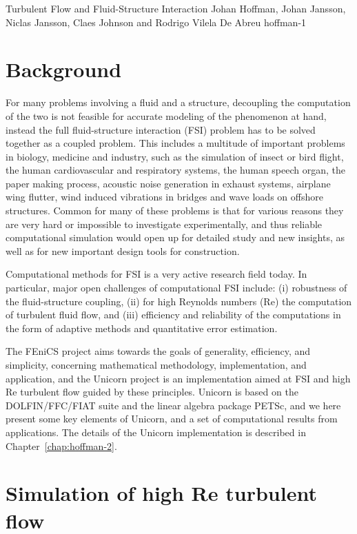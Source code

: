               {Turbulent Flow and Fluid-Structure Interaction}
              {Johan Hoffman, Johan Jansson, Niclas Jansson, Claes Johnson and Rodrigo Vilela De Abreu}
              {hoffman-1}

\section{Background}

For many problems involving a fluid and a structure, decoupling the computation of the two is
not feasible for accurate modeling of the phenomenon at hand, instead the full fluid-structure interaction (FSI) problem
has to be solved together as a coupled problem. This includes a multitude of important
problems in biology, medicine and industry, such as the simulation of insect or bird flight, the
human cardiovascular and respiratory systems, the human speech organ, the paper making process,
acoustic noise generation in exhaust systems, airplane wing flutter, wind induced vibrations in
bridges and wave loads on offshore structures. Common for many of these problems is that
for various reasons they are very hard or impossible to investigate experimentally, and thus
reliable computational simulation would open up for detailed study and new insights, as well
as for new important design tools for construction.

Computational methods for FSI is a very active research field today. In particular, major open challenges of computational FSI include: (i) robustness of the fluid-structure coupling, (ii) for high Reynolds numbers (Re) the computation
of turbulent fluid flow, and (iii) efficiency and reliability of the computations in the form of
adaptive methods and quantitative error estimation.

The FEniCS project aims towards the goals of generality, efficiency, and simplicity, concerning mathematical methodology, implementation, and application, and the Unicorn project is an implementation aimed at FSI and high Re turbulent flow guided by these principles. Unicorn is based on the DOLFIN/FFC/FIAT suite and the linear algebra package PETSc, and
we here present some key elements of Unicorn, and a set of computational results from applications. The details of the Unicorn implementation is described in Chapter~\ref{chap:hoffman-2}.

\section{Simulation of high Re turbulent flow}

